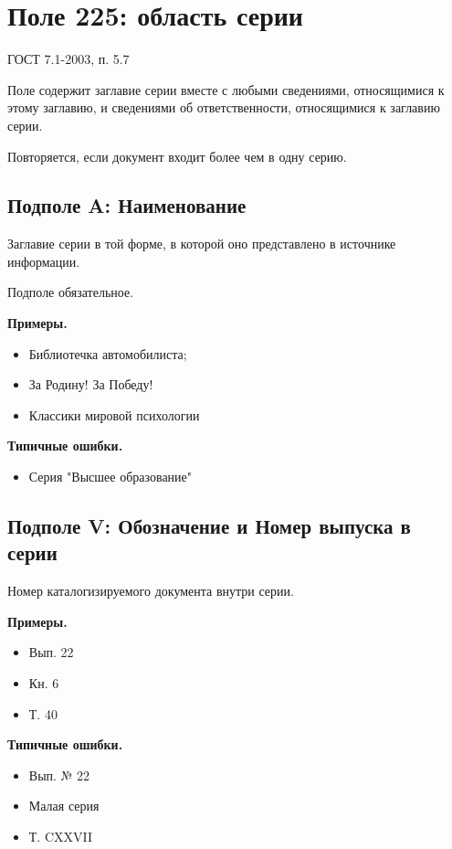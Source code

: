 \chapter*{Поле 225: область серии}

ГОСТ 7.1-2003, п. 5.7

Поле содержит заглавие серии вместе с любыми сведениями, относящимися к этому заглавию, и сведениями об ответственности, относящимися к заглавию серии.

Повторяется, если документ входит более чем в одну серию.

\section*{Подполе A: Наименование}

Заглавие серии в той форме, в которой оно представлено в источнике информации.

Подполе обязательное.

\textbf{Примеры.}

\begin{itemize}
	\item Библиотечка автомобилиста;
	\item За Родину! За Победу!
	\item Классики мировой психологии
\end{itemize}

\textbf{Типичные ошибки.}

\begin{itemize}
	\item Серия "Высшее образование"
\end{itemize}

\section*{Подполе V: Обозначение и Номер выпуска в серии}

Номер каталогизируемого документа внутри серии.

\textbf{Примеры.}

\begin{itemize}
	\item Вып. 22
	\item Кн. 6
	\item Т. 40	
\end{itemize}

\textbf{Типичные ошибки.}

\begin{itemize}
	\item Вып. № 22
	\item Малая серия
	\item Т. CXXVII
\end{itemize}
